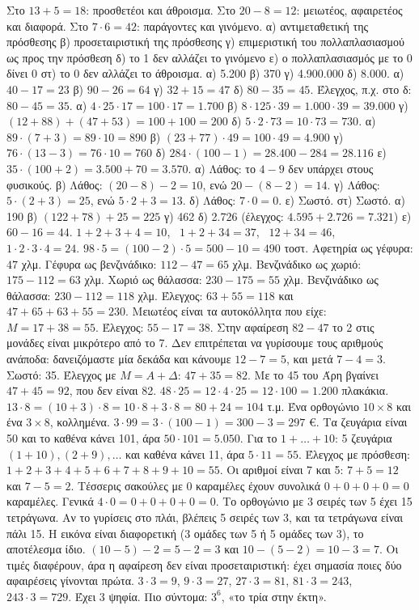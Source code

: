  Στο $13+5=18$: προσθετέοι και άθροισμα. Στο $20-8=12$: μειωτέος, αφαιρετέος και διαφορά. Στο $7\cdot 6=42$: παράγοντες και γινόμενο.
 α) αντιμεταθετική της πρόσθεσης \quad β) προσεταιριστική της πρόσθεσης \quad γ) επιμεριστική του πολλαπλασιασμού ως προς την πρόσθεση \quad δ) το 1 δεν αλλάζει το γινόμενο \quad ε) ο πολλαπλασιασμός με το 0 δίνει 0 \quad στ) το 0 δεν αλλάζει το άθροισμα.
 α) 5.200 \quad β) 370 \quad γ) 4.900.000 \quad δ) 8.000.
 α) $40-17=23$ \quad β) $90-26=64$ \quad γ) $32+15=47$ \quad δ) $80-35=45$. Έλεγχος, π.χ. στο δ: $80-45=35$.
 α) $4\cdot 25\cdot 17=100\cdot 17=1.700$ \quad β) $8\cdot 125\cdot 39=1.000\cdot 39=39.000$ \quad γ) $(12+88)+(47+53)=100+100=200$ \quad δ) $5\cdot 2\cdot 73=10\cdot 73=730$.
 α) $89\cdot(7+3)=89\cdot 10=890$ \quad β) $(23+77)\cdot 49=100\cdot 49=4.900$ \quad γ) $76\cdot(13-3)=76\cdot 10=760$ \quad δ) $284\cdot(100-1)=28.400-284=28.116$ \quad ε) $35\cdot(100+2)=3.500+70=3.570$.
 α) Λάθος: το $4-9$ δεν υπάρχει στους φυσικούς. β) Λάθος: $(20-8)-2=10$, ενώ $20-(8-2)=14$. γ) Λάθος: $5\cdot(2+3)=25$, ενώ $5\cdot 2+3=13$. δ) Λάθος: $7\cdot 0=0$. ε) Σωστό. στ) Σωστό.
 α) 190 \quad β) $(122+78)+25=225$ \quad γ) 462 \quad δ) 2.726 (έλεγχος: $4.595+2.726=7.321$) \quad ε) $60-16=44$.
 $1+2+3+4=10$, \ $1+2+34=37$, \ $12+34=46$, \ $1\cdot 2\cdot 3\cdot 4=24$.
 $98\cdot 5=(100-2)\cdot 5=500-10=490$ τοστ.
 Αφετηρία ως γέφυρα: $47$ χλμ. Γέφυρα ως βενζινάδικο: $112-47=65$ χλμ. Βενζινάδικο ως χωριό: $175-112=63$ χλμ. Χωριό ως θάλασσα: $230-175=55$ χλμ. Βενζινάδικο ως θάλασσα: $230-112=118$ χλμ. Έλεγχος: $63+55=118$ και $47+65+63+55=230$.
 Μειωτέος είναι τα αυτοκόλλητα που είχε: $Μ=17+38=55$. Έλεγχος: $55-17=38$.
 Στην αφαίρεση $82-47$ το 2 στις μονάδες είναι μικρότερο από το 7. Δεν επιτρέπεται να γυρίσουμε τους αριθμούς ανάποδα: δανειζόμαστε μία δεκάδα και κάνουμε $12-7=5$, και μετά $7-4=3$. Σωστό: 35. Έλεγχος με $Μ=Α+\Delta$: $47+35=82$. Με το 45 του Άρη βγαίνει $47+45=92$, που δεν είναι 82.
 $48\cdot 25=12\cdot 4\cdot 25=12\cdot 100=1.200$ πλακάκια.
 $13\cdot 8=(10+3)\cdot 8=10\cdot 8+3\cdot 8=80+24=104$ τ.μ. Ένα ορθογώνιο $10\times 8$ και ένα $3\times 8$, κολλημένα.
 $3\cdot 99=3\cdot(100-1)=300-3=297$ €.
 Τα ζευγάρια είναι 50 και το καθένα κάνει 101, άρα $50\cdot 101=5.050$. Για το $1+\dots+10$: 5 ζευγάρια $(1+10),(2+9),\dots$ και καθένα κάνει 11, άρα $5\cdot 11=55$. Έλεγχος με πρόσθεση: $1+2+3+4+5+6+7+8+9+10=55$.
 Οι αριθμοί είναι 7 και 5: $7+5=12$ και $7-5=2$.
 Τέσσερις σακούλες με 0 καραμέλες έχουν συνολικά $0+0+0+0=0$ καραμέλες. Γενικά $4\cdot 0=0+0+0+0=0$.
 Το ορθογώνιο με 3 σειρές των 5 έχει 15 τετράγωνα. Αν το γυρίσεις στο πλάι, βλέπεις 5 σειρές των 3, και τα τετράγωνα είναι πάλι 15. Η εικόνα είναι διαφορετική (3 ομάδες των 5 ή 5 ομάδες των 3), το αποτέλεσμα ίδιο.
 $(10-5)-2=5-2=3$ και $10-(5-2)=10-3=7$. Οι τιμές διαφέρουν, άρα η αφαίρεση δεν είναι προσεταιριστική: έχει σημασία ποιες δύο αφαιρέσεις γίνονται πρώτα.
 $3\cdot 3=9$, $9\cdot 3=27$, $27\cdot 3=81$, $81\cdot 3=243$, $243\cdot 3=729$. Έχει 3 ψηφία. Πιο σύντομα: $3^6$, «το τρία στην έκτη».
